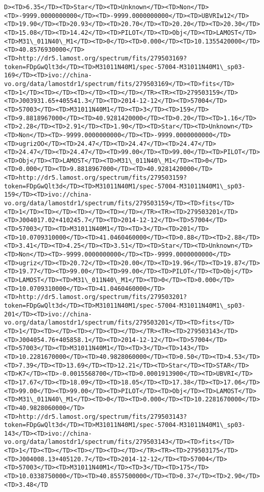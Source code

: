 \documentclass[11pt]{article}
\begin{document}
\begin{Verbatim}[commandchars=\\\{\}]
D><TD>6.35</TD><TD>Star</TD><TD>Unknown</TD><TD>Non</TD><TD>-9999.0000000000</TD><TD>-9999.0000000000</TD><TD>UBVRIw12</TD><TD>19.90</TD><TD>20.93</TD><TD>20.70</TD><TD>20.20</TD><TD>20.30</TD><TD>15.08</TD><TD>14.42</TD><TD>PILOT</TD><TD>Obj</TD><TD>LAMOST</TD><TD>M31\_011N40\_M1</TD><TD>0</TD><TD>0.000</TD><TD>10.1355420000</TD><TD>40.8576930000</TD><TD>http://dr5.lamost.org/spectrum/fits/279503169?token=FDpGwQlt3d</TD><TD>M31011N40M1/spec-57004-M31011N40M1\_sp03-169</TD><TD>ivo://china-vo.org/data/lamostdr1/spectrum/fits/279503169</TD><TD>fits</TD><TD>1</TD><TD></TD><TD></TD><TD></TD></TR><TR><TD>279503159</TD><TD>J003931.65+405541.3</TD><TD>2014-12-12</TD><TD>57004</TD><TD>57003</TD><TD>M31011N40M1</TD><TD>3</TD><TD>159</TD><TD>9.8818967000</TD><TD>40.9281420000</TD><TD>0.20</TD><TD>1.16</TD><TD>2.28</TD><TD>2.91</TD><TD>1.90</TD><TD>Star</TD><TD>Unknown</TD><TD>Non</TD><TD>-9999.0000000000</TD><TD>-9999.0000000000</TD><TD>ugrizOO</TD><TD>24.47</TD><TD>24.47</TD><TD>24.47</TD><TD>24.47</TD><TD>24.47</TD><TD>99.00</TD><TD>99.00</TD><TD>PILOT</TD><TD>Obj</TD><TD>LAMOST</TD><TD>M31\_011N40\_M1</TD><TD>0</TD><TD>0.000</TD><TD>9.8818967000</TD><TD>40.9281420000</TD><TD>http://dr5.lamost.org/spectrum/fits/279503159?token=FDpGwQlt3d</TD><TD>M31011N40M1/spec-57004-M31011N40M1\_sp03-159</TD><TD>ivo://china-vo.org/data/lamostdr1/spectrum/fits/279503159</TD><TD>fits</TD><TD>1</TD><TD></TD><TD></TD><TD></TD></TR><TR><TD>279503201</TD><TD>J004017.02+410245.7</TD><TD>2014-12-12</TD><TD>57004</TD><TD>57003</TD><TD>M31011N40M1</TD><TD>3</TD><TD>201</TD><TD>10.0709310000</TD><TD>41.0460460000</TD><TD>0.88</TD><TD>2.88</TD><TD>3.41</TD><TD>4.25</TD><TD>3.51</TD><TD>Star</TD><TD>Unknown</TD><TD>Non</TD><TD>-9999.0000000000</TD><TD>-9999.0000000000</TD><TD>ugriz</TD><TD>20.72</TD><TD>20.00</TD><TD>19.96</TD><TD>19.87</TD><TD>19.77</TD><TD>99.00</TD><TD>99.00</TD><TD>PILOT</TD><TD>Obj</TD><TD>LAMOST</TD><TD>M31\_011N40\_M1</TD><TD>0</TD><TD>0.000</TD><TD>10.0709310000</TD><TD>41.0460460000</TD><TD>http://dr5.lamost.org/spectrum/fits/279503201?token=FDpGwQlt3d</TD><TD>M31011N40M1/spec-57004-M31011N40M1\_sp03-201</TD><TD>ivo://china-vo.org/data/lamostdr1/spectrum/fits/279503201</TD><TD>fits</TD><TD>1</TD><TD></TD><TD></TD><TD></TD></TR><TR><TD>279503143</TD><TD>J004054.76+405858.1</TD><TD>2014-12-12</TD><TD>57004</TD><TD>57003</TD><TD>M31011N40M1</TD><TD>3</TD><TD>143</TD><TD>10.2281670000</TD><TD>40.9828060000</TD><TD>0.50</TD><TD>4.53</TD><TD>7.39</TD><TD>13.69</TD><TD>12.21</TD><TD>Star</TD><TD>STAR</TD><TD>K7</TD><TD>-0.0015568700</TD><TD>0.0001913900</TD><TD>UBVRI</TD><TD>17.67</TD><TD>18.09</TD><TD>18.05</TD><TD>17.38</TD><TD>17.06</TD><TD>99.00</TD><TD>99.00</TD><TD>PILOT</TD><TD>Obj</TD><TD>LAMOST</TD><TD>M31\_011N40\_M1</TD><TD>0</TD><TD>0.000</TD><TD>10.2281670000</TD><TD>40.9828060000</TD><TD>http://dr5.lamost.org/spectrum/fits/279503143?token=FDpGwQlt3d</TD><TD>M31011N40M1/spec-57004-M31011N40M1\_sp03-143</TD><TD>ivo://china-vo.org/data/lamostdr1/spectrum/fits/279503143</TD><TD>fits</TD><TD>1</TD><TD></TD><TD></TD><TD></TD></TR><TR><TD>279503175</TD><TD>J004008.13+405120.7</TD><TD>2014-12-12</TD><TD>57004</TD><TD>57003</TD><TD>M31011N40M1</TD><TD>3</TD><TD>175</TD><TD>10.0338750000</TD><TD>40.8557500000</TD><TD>0.37</TD><TD>2.90</TD><TD>3.48</TD
\end{Verbatim}
\end{document}
